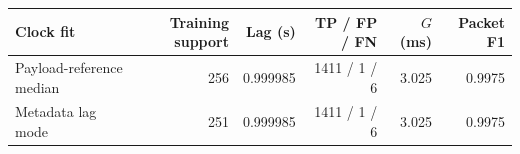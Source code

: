 \begin{tabularx}{\linewidth}{@{}Yrrrrr@{}}\toprule
Clock fit & Training support & Lag (s) & TP / FP / FN & $G$ (ms) & Packet F1 \\\midrule
Payload-reference median & 256 & 0.999985 & 1411 / 1 / 6 & 3.025 & 0.9975 \\
Metadata lag mode & 251 & 0.999985 & 1411 / 1 / 6 & 3.025 & 0.9975 \\
\bottomrule\end{tabularx}
